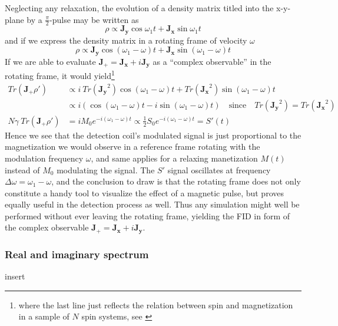 \documentclass[11.5pt,a4paper]{article}
\begin{document}
Neglecting any relaxation, the evolution of a density matrix titled into the x-y-plane by a $\tfrac{\pi}{2}$-pulse may be written as 
\begin{equation}
 \rho \propto \mathbf{J_y} \cos \omega_1 t + \mathbf{J_x} \sin \omega_1 t
\end{equation}
and if we express the density matrix in a rotating frame of velocity $\omega$
\begin{equation}
 \rho \propto \mathbf{J_y} \cos (\omega_1-\omega) t + \mathbf{J_x} \sin (\omega_1-\omega) t
\end{equation}
If we are able to evaluate $\mathbf{J_+} = \mathbf{J_x} + i \mathbf{J_y}$ as a ``complex observable'' in the rotating frame, it would yield\footnote{where the last line just reflects the relation between spin and magnetization in a sample of $N$ spin systems, see \cite[chap. 4.3.1 Free precession and Faraday detection, p. 125]{nmr-ox}}
\begin{align}
 Tr( \mathbf{J_+} \rho' ) & \propto i\ Tr(\mathbf{J_y}^2) \cos (\omega_1-\omega) t + Tr(\mathbf{J_x}^2) \sin (\omega_1-\omega) t \\
& \propto i ( \cos (\omega_1-\omega) t - i \sin (\omega_1-\omega) t ) \quad \text{since} \quad Tr(\mathbf{J_y}^2) = Tr(\mathbf{J_x}^2) \\
N\gamma \ Tr( \mathbf{J_+} \rho' ) & = i M_0 e^{-i (\omega_1-\omega) t} \propto \frac{1}{2} S_0 e^{-i (\omega_1-\omega) t} = S'(t)
\end{align}
Hence we see that the detection coil's modulated signal is just proportional to the magnetization we would observe in a reference frame rotating with the modulation frequency $\omega$, and same applies for a relaxing manetization $M(t)$ instead of $M_0$ modulating the signal. The $S'$ signal oscillates at frequency $\Delta \omega = \omega_1 - \omega$, and the conclusion to draw is that the rotating frame does not only constitute a handy tool to visualize the effect of a magnetic pulse, but proves equally useful in the detection process as well. Thus any simulation might well be performed without ever leaving the rotating frame, yielding the FID in form of the complex observable $\mathbf{J_+} = \mathbf{J_x} + i \mathbf{J_y}$.

\subsubsection{Real and imaginary spectrum}
insert
\end{document}
